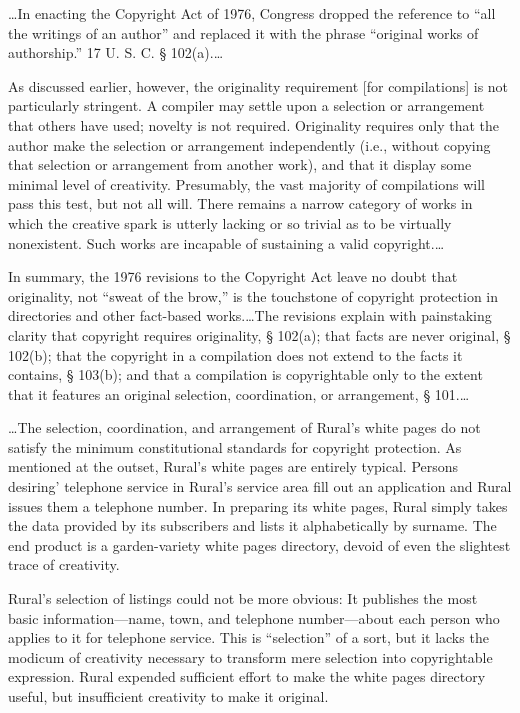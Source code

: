 
\dots In enacting the Copyright Act of 1976, Congress dropped the reference to
``all the writings of an author'' and replaced it with the phrase ``original
works of authorship.'' 17 U. S. C. {\S} 102(a).\ldots

As discussed earlier, however, the originality requirement [for compilations] is
not particularly stringent. A compiler may settle upon a selection or
arrangement that others have used; novelty is not required. Originality
requires only that the author make the selection or arrangement independently
(i.e., without copying that selection or arrangement from another work), and
that it display some minimal level of creativity. Presumably, the vast majority
of compilations will pass this test, but not all will. There remains a narrow
category of works in which the creative spark is utterly lacking or so trivial
as to be virtually nonexistent. Such works are incapable of sustaining a valid
copyright.\ldots

In summary, the 1976 revisions to the Copyright Act leave no doubt that
originality, not ``sweat of the brow,'' is the touchstone of copyright
protection in directories and other fact-based works.\ldots The revisions
explain with painstaking clarity that copyright requires originality, {\S}
102(a); that facts are never original, {\S} 102(b); that the copyright in a
compilation does not extend to the facts it contains, {\S} 103(b); and that a
compilation is copyrightable only to the extent that it features an original
selection, coordination, or arrangement, {\S} 101.\ldots


\ldots The selection, coordination, and arrangement of Rural's white pages do
not
satisfy the minimum constitutional standards for copyright protection. As
mentioned at the outset, Rural's white pages are entirely typical. Persons
desiring' telephone service in Rural's service area fill out an application and
Rural issues them a telephone number. In preparing its white pages, Rural
simply takes the data provided by its subscribers and lists it alphabetically
by surname. The end product is a garden-variety white pages directory, devoid
of even the slightest trace of creativity.

Rural's selection of listings could not be more obvious: It publishes the most
basic information---name, town, and telephone number---about each person who
applies to it for telephone service. This is ``selection'' of a sort, but it
lacks the modicum of creativity necessary to transform mere selection into
copyrightable expression. Rural expended sufficient effort to make the white
pages directory useful, but insufficient creativity to make it original.

